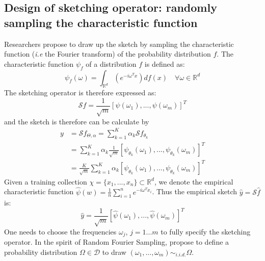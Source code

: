 \documentclass[12pt,a4paper]{article}
\begin{document}
\subsection{Design of sketching operator: randomly sampling the characteristic function}
Researchers \cite{keriven:hal-01329195} propose to draw up the sketch by sampling the characteristic function (\textit{i.e} the Fourier transform) of the probability distribution $f$.
The characteristic function $\psi_f$ of a distribution $f$ is defined as:
\begin{equation}
    \psi_{f}(\omega) = \int_{\mathbb{R}^d} (e^{-i\omega^T x})d f(x) \quad  \forall \omega \in \mathbb{R}^d
\end{equation}
The sketching operator is therefore expressed as:
\begin{equation}
\mathcal{S}f = \frac{1}{\sqrt{m}}[\psi(\omega_1),...,\psi(\omega_m)]^T
\end{equation}
and the sketch is therefore can be calculate by 
\begin{equation}
\begin{aligned}
    y &= \mathcal{S}f_{\Theta, \alpha} = \sum_{k=1}^K \alpha_k \mathcal{S} f_{\theta_k}
\\&=\sum_{k=1}^K \alpha_k \frac{1}{\sqrt{m}}[\psi_{\theta_k}(\omega_1),...,\psi_{\theta_k}(\omega_m)]^T \\&= \frac{K}{\sqrt{m}}\sum_{k=1}^K \alpha_k [\psi_{\theta_k}(\omega_1),...,\psi_{\theta_k}(\omega_m)]^T
\end{aligned}
\end{equation}
Given a training collection $\chi =\{x_1,...,x_n\} \subset \mathbb{R}^d$, we denote the empirical characteristic function $\hat{\psi}(w) = \frac{1}{n} \sum_{i = 1}^n e ^{-i\omega^T x_i}$.
Thus the empirical sketch $\hat{y} = \mathcal{S}\hat{f}$ is:
\begin{equation}
    \hat{y} = \frac{1}{\sqrt{m}}[\hat{\psi}(\omega_1),...,\hat{\psi}(\omega_m)]^T
\end{equation}
One needs to choose the frequencies $\omega_j$, $j = 1...m$ to fully specify the sketching operator.
In the spirit of Random Fourier Sampling, \cite{keriven:hal-01329195} propose to define a probability distribution $\Omega \in \mathcal{D}$ to draw $(\omega_1,...,\omega_m) \sim _{i.i.d.}\Omega$.
\end{document}
